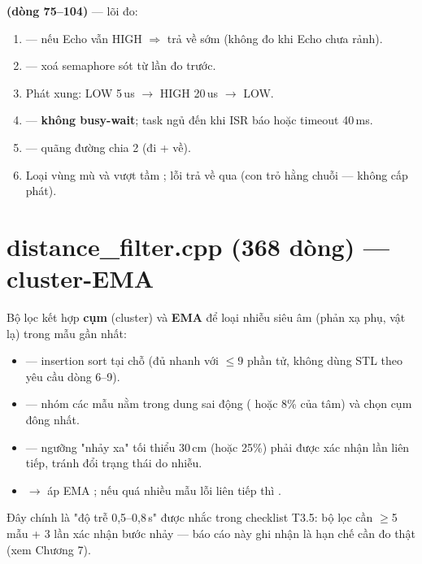 \textbf{ (dòng 75--104)} — lõi đo:
\begin{enumerate}
\item {} — nếu Echo vẫn HIGH $\Rightarrow$
 trả về sớm (không đo khi Echo chưa rảnh).
\item {} — xoá semaphore sót từ lần đo
trước.
\item Phát xung: LOW 5\,us $\rightarrow$ HIGH 20\,us $\rightarrow$ LOW.
\item {} — \textbf{không
busy-wait}; task ngủ đến khi ISR báo hoặc timeout 40\,ms.
\item {} —
quãng đường chia 2 (đi + về).
\item Loại vùng mù  và vượt tầm
; lỗi trả về qua  (con trỏ
hằng chuỗi — không cấp phát).
\end{enumerate}

\section{distance\_filter.cpp (368 dòng) — cluster-EMA}

Bộ lọc kết hợp \textbf{cụm} (cluster) và \textbf{EMA} để loại nhiễu siêu âm
(phản xạ phụ, vật lạ) trong  mẫu gần nhất:
\begin{itemize}
\item {} — insertion sort tại chỗ (đủ nhanh với $\le 9$ phần tử,
không dùng STL theo yêu cầu dòng 6--9).
\item {} — nhóm các mẫu nằm trong dung sai động
( hoặc 8\% của tâm) và chọn cụm
đông nhất.
\item {} — ngưỡng "nhảy xa" tối thiểu
30\,cm (hoặc 25\%) phải được xác nhận 
lần liên tiếp, tránh đổi trạng thái do nhiễu.
\item {} $\rightarrow$ 
áp EMA ; nếu quá nhiều mẫu lỗi liên tiếp
 thì .
\end{itemize}

Đây chính là "độ trễ 0,5--0,8\,s" được nhắc trong checklist T3.5: bộ lọc cần
$\ge$5 mẫu + 3 lần xác nhận bước nhảy — báo cáo này ghi nhận là hạn chế cần đo
thật (xem Chương 7).

